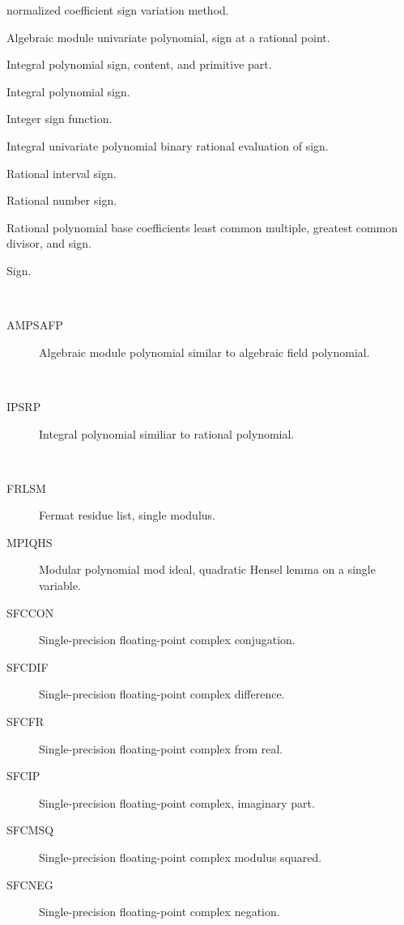 \begin{description}
\begin{description}
    normalized coefficient sign variation method.
  \item[AMUPSR]  Algebraic module univariate polynomial, sign at a rational
    point.
  \item[IPSCPP]  Integral polynomial sign, content, and primitive part.
  \item[IPSIGN]  Integral polynomial sign.
  \item[ISIGNF]  Integer sign function.
  \item[IUPBES]  Integral univariate polynomial binary rational evaluation of
    sign.
  \item[RISIGN]  Rational interval sign.
  \item[RNSIGN]  Rational number sign.
  \item[RPBLGS]  Rational polynomial base coefficients least common multiple,
    greatest common divisor, and sign.
  \item[SIGN]  Sign.
  \end{description}
\item[similar] \ \ 
  \begin{description}
  \item[AMPSAFP]  Algebraic module polynomial similar to algebraic field
    polynomial.
  \end{description}
\item[similiar] \ \ 
  \begin{description}
  \item[IPSRP]  Integral polynomial similiar to rational polynomial.
  \end{description}
\item[single] \ \ 
  \begin{description}
  \item[FRLSM]  Fermat residue list, single modulus.
  \item[MPIQHS]  Modular polynomial mod ideal, quadratic Hensel lemma on a
    single variable.
  \item[SFCCON]  Single-precision floating-point complex conjugation.
  \item[SFCDIF]  Single-precision floating-point complex difference.
  \item[SFCFR]  Single-precision floating-point complex from real.
  \item[SFCIP]  Single-precision floating-point complex, imaginary part.
  \item[SFCMSQ]  Single-precision floating-point complex modulus squared.
  \item[SFCNEG]  Single-precision floating-point complex negation.

\end{description}
\end{description}
